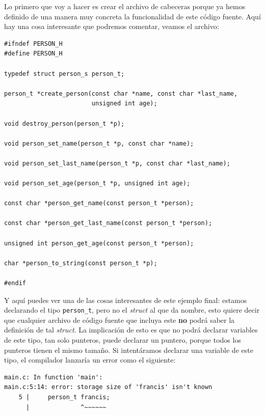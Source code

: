 \documentclass[a4paper]{article}
\begin{document}
Lo primero que voy a hacer es crear el archivo de cabeceras porque ya hemos
definido de una manera muy concreta la funcionalidad de este código fuente.
Aquí hay una cosa interesante que podremos comentar, veamos el archivo:

\noindent
\begin{minipage}[H]{\linewidth}
\mbox{}
\begin{lstlisting}[style=C,
caption={Ejemplo final de programa -- \texttt{person.h}},
label={lst:finalExPerson_h}]
#ifndef PERSON_H
#define PERSON_H

typedef struct person_s person_t;

person_t *create_person(const char *name, const char *last_name,
                        unsigned int age);

void destroy_person(person_t *p);

void person_set_name(person_t *p, const char *name);

void person_set_last_name(person_t *p, const char *last_name);

void person_set_age(person_t *p, unsigned int age);

const char *person_get_name(const person_t *person);

const char *person_get_last_name(const person_t *person);

unsigned int person_get_age(const person_t *person);

char *person_to_string(const person_t *p);

#endif
\end{lstlisting}
\end{minipage}

Y aquí puedes ver una de las cosas interesantes de este ejemplo final: estamos
declarando el tipo \verb!person_t!, pero no el \textit{struct} al que da nombre,
esto quiere decir que cualquier archivo de código fuente que incluya este
\textbf{no} podrá saber la definición de tal \textit{struct}. La implicación de
esto es que no podrá declarar variables de este tipo, tan solo punteros, puede
declarar un puntero, porque todos los punteros tienen el mismo tamaño. Si
intentáramos declarar una variable de este tipo, el compilador lanzaría un error
como el siguiente:

\noindent
\begin{minipage}[H]{\linewidth}
\mbox{}
\begin{lstlisting}[style=terminalStyle]
main.c: In function 'main':
main.c:5:14: error: storage size of 'francis' isn't known
    5 |     person_t francis;
      |              ^~~~~~~
\end{lstlisting}
\end{minipage}
\end{document}

